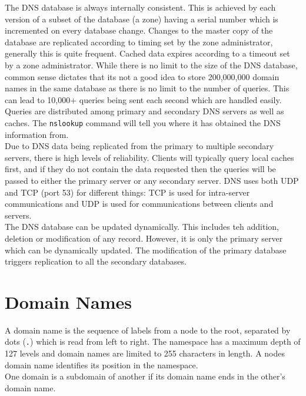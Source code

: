 The DNS database is always internally consistent. This is achieved by each version of a subset of the database (a zone) having a serial number which is incremented on every database change. Changes to the master copy of the database are replicated according to timing set by the zone administrator, generally this is quite frequent. Cached data expires according to a timeout set by a zone administrator. While there is no limit to the size of the DNS database, common sense dictates that its not a  good idea to store 200,000,000 domain names in the same database as there is no limit to the number of queries. This can lead to 10,000+ queries being sent each second which are handled easily. Queries are distributed among primary and secondary DNS servers as well as caches. The \verb|nslookup| command will tell you where it has obtained the DNS information from.\\

Due to DNS data being replicated from the primary to multiple secondary servers, there is high levels of reliability. Clients will typically query local caches first, and if they do not contain the data requested then the queries will be passed to either the primary server or any secondary server. DNS uses both UDP and TCP (port 53) for different things: TCP is used for intra-server communications and UDP is used for communications between clients and servers.\\

The DNS database can be updated dynamically. This includes teh addition, deletion or modification of any record. However, it is only the primary server which can be dynamically updated. The modification of the primary database triggers replication to all the secondary databases.

\section{Domain Names}
A domain name is the sequence of labels from a node to the root, separated by dots (\verb|.|) which is read from left to right. The namespace has a maximum depth of 127 levels and domain names are limited to 255 characters in length. A nodes domain name identifies its position in the namespace.\\


One domain is a subdomain of another if its domain name ends in the other's domain name. 


